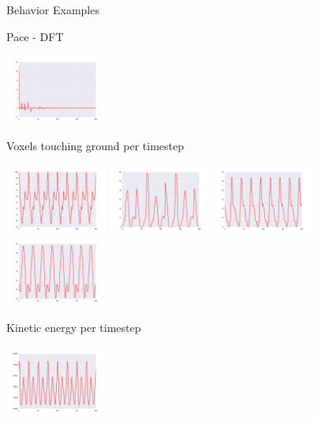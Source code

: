 \documentclass{beamer}
\begin{document}
\begin{frame}[allowframebreaks]{Behavior Examples}
\begin{minipage}{\textwidth}
\begin{block}{Pace - DFT}
\begin{center}
\includegraphics[width=0.25\textwidth]{figures/behaviors/33.pdf}
\end{center}
\end{block}
\end{minipage}

\begin{minipage}{\textwidth}
\begin{block}{Voxels touching ground per timestep}
\begin{center}
\includegraphics[width=0.25\textwidth]{figures/behaviors/40.pdf}
\includegraphics[width=0.25\textwidth]{figures/behaviors/41.pdf}
\includegraphics[width=0.25\textwidth]{figures/behaviors/42.pdf}
\includegraphics[width=0.25\textwidth]{figures/behaviors/43.pdf}
\end{center}
\end{block}
\begin{block}{Kinetic energy per timestep}
\begin{center}
\includegraphics[width=0.25\textwidth]{figures/behaviors/50.pdf}

\end{center}
\end{block}
\end{minipage}
\end{frame}
\end{document}
